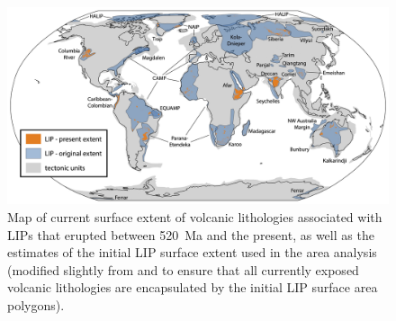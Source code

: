 \begin{figure}[h!]
\begin{center}
	\includegraphics[width=\textwidth]{figures/LIPs/LIP-map.jpg}
	\caption[Map of surface extent of volcanic lithologies associated with large igneous provinces that erupted between 520~Ma and the present.]{Map of current surface extent of volcanic lithologies associated with LIPs that erupted between 520~Ma and the present, as well as the estimates of the initial LIP surface extent used in the area analysis (modified slightly from \citealp{Ernst2017a} and \citealp{Ernst2019a} to ensure that all currently exposed volcanic lithologies are encapsulated by the initial LIP surface area polygons).}
	\label{fig:LIP-map}
\end{center}
\end{figure}


